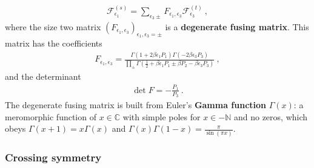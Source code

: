 \documentclass[12pt, a4paper]{article}
\newcommand{\myindex}[1]{\textbf{\boldmath #1}}
\theoremstyle{break}
\begin{document}
\begin{align}
 \mathcal{F}^{(s)}_{\epsilon_1} = \sum_{\epsilon_3\pm} F_{\epsilon_1,\epsilon_3} \mathcal{F}^{(t)}_{\epsilon_3}\ , 
 \label{fsfft}
\end{align}
where the size two matrix $\left(F_{\epsilon_1,\epsilon_3}\right)_{\epsilon_1,\epsilon_3=\pm}$ is a \myindex{degenerate fusing matrix}. This matrix has the coefficients 
\begin{align}
 \boxed{F_{\epsilon_1,\epsilon_3} = \frac{\Gamma(1+2\beta\epsilon_1P_1)\Gamma(-2\beta \epsilon_3P_3)}{\prod_\pm \Gamma(\frac12 +\beta \epsilon_1P_1 \pm \beta P_2 -\beta \epsilon_3P_3)}}\ ,
 \label{fee}
\end{align}
and the determinant 
\begin{align}
 \det F = -\frac{P_1}{P_3}\ .
 \label{detf}
\end{align}
The degenerate fusing matrix is built from Euler's \myindex{Gamma function} $\Gamma(x)$: a meromorphic function of $x\in\mathbb{C}$ with simple poles for $x\in -\mathbb{N}$ and no zeros, which obeys $\Gamma(x+1)=x\Gamma(x)$ and $\Gamma(x)\Gamma(1-x)=\frac{\pi}{\sin(\pi x)}$. 

\subsubsection{Crossing symmetry}
\end{document}
